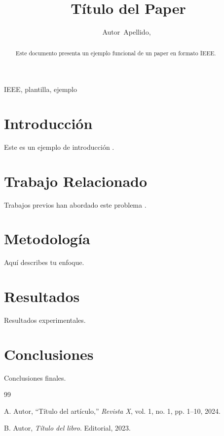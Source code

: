 \documentclass[journal]{IEEEtran}
\begin{document}
\title{Título del Paper}
\author{Autor~Apellido,~}

\maketitle

\begin{abstract}
Este documento presenta un ejemplo funcional de un paper en formato IEEE.
\end{abstract}

\begin{IEEEkeywords}
IEEE, plantilla, ejemplo
\end{IEEEkeywords}

\section{Introducción}
\label{sec:intro}
Este es un ejemplo de introducción \cite{ref1}.

\section{Trabajo Relacionado}
\label{sec:related}
Trabajos previos han abordado este problema \cite{ref2}.

\section{Metodología}
\label{sec:method}
Aquí describes tu enfoque.

\section{Resultados}
\label{sec:results}
Resultados experimentales.

\section{Conclusiones}
\label{sec:conclusion}
Conclusiones finales.

\begin{thebibliography}{99}

A. Autor, ``Título del artículo,'' \emph{Revista X}, vol. 1, no. 1, pp. 1--10, 2024.

B. Autor, \emph{Título del libro}. Editorial, 2023.

\end{thebibliography}
\end{document}
